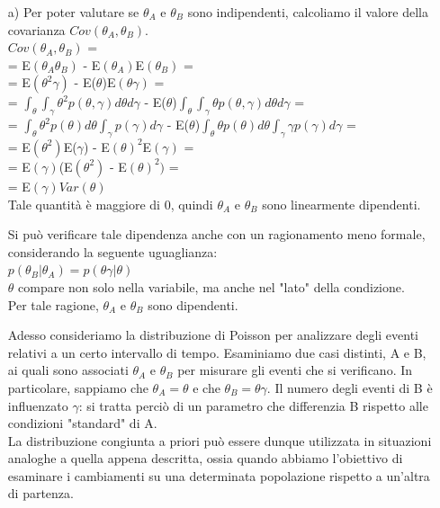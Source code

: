 \begin{enumerate}
\item [a)] Per poter valutare se $\theta_A$ e $\theta_B$ sono indipendenti, calcoliamo il valore della covarianza $Cov(\theta_A, \theta_B)$.\\

$Cov(\theta_A, \theta_B)$ = \\

= E$(\theta_A\theta_B)$ - E$(\theta_A)$E$(\theta_B)$ =\\

= E$(\theta^2\gamma)$ - E($\theta$)E$(\theta\gamma)$ =\\

= $\int_\theta \int_\gamma \theta^2 p(\theta,\gamma) d\theta d\gamma$ - E($\theta$)$\int_\theta \int_\gamma \theta p(\theta,\gamma) d\theta d\gamma$ =\\

= $\int_\theta \theta^2 p(\theta)d\theta \int_\gamma p(\gamma)d\gamma $ - E($\theta$)$\int_\theta \theta p(\theta)d\theta \int_\gamma \gamma p(\gamma)d\gamma$ = \\

= E$(\theta^2)$E($\gamma$) - E$(\theta)^2$E$(\gamma)$ = \\

= E$(\gamma)$(E$(\theta^2)$ - E$(\theta)^2)$ =\\

= E$(\gamma)Var(\theta)$\\

Tale quantità è maggiore di 0, quindi $\theta_A$ e $\theta_B$ sono linearmente dipendenti.

Si può verificare tale dipendenza anche con un ragionamento meno formale, considerando la seguente uguaglianza:\\

$p(\theta_B|\theta_A)=p(\theta\gamma|\theta)$\\

$\theta$ compare non solo nella variabile, ma anche nel "lato" della condizione.\\
Per tale ragione, $\theta_A$ e $\theta_B$ sono dipendenti.

Adesso consideriamo la distribuzione di Poisson per analizzare degli eventi relativi a un certo intervallo di tempo. Esaminiamo due casi distinti, A e B, ai quali sono associati $\theta_A$ e $\theta_B$ per misurare gli eventi che si verificano. In particolare, sappiamo che 
$\theta_A = \theta$ e che $\theta_B = \theta\gamma$.
Il numero degli eventi di B è influenzato $\gamma$: si tratta perciò di un parametro che differenzia B rispetto alle condizioni "standard" di A.\\
La distribuzione congiunta a priori può essere dunque utilizzata in situazioni analoghe a quella appena descritta, ossia quando abbiamo l'obiettivo di esaminare i cambiamenti su una determinata popolazione rispetto a un'altra di partenza. \\


\end{enumerate}
